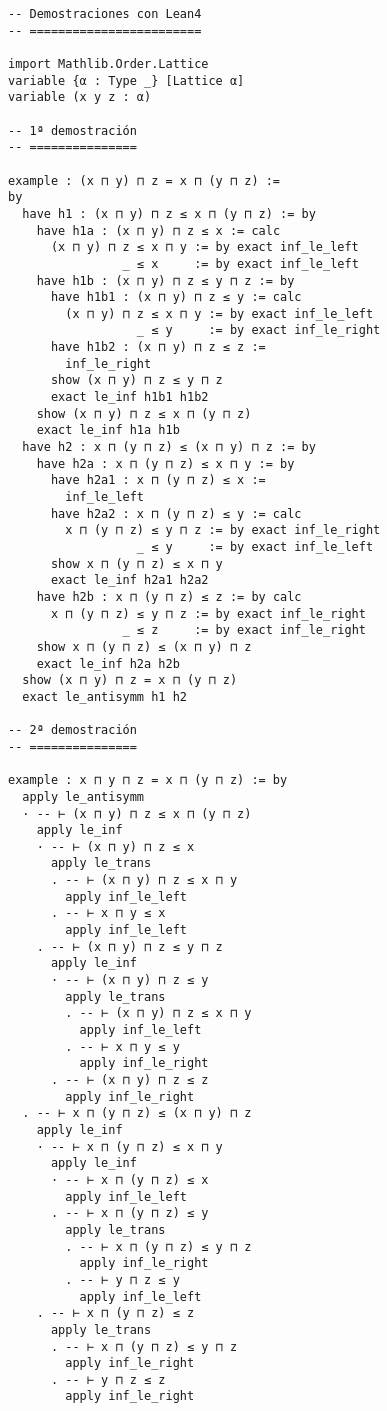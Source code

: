 \begin{verbatim}
-- Demostraciones con Lean4
-- ========================

import Mathlib.Order.Lattice
variable {α : Type _} [Lattice α]
variable (x y z : α)

-- 1ª demostración
-- ===============

example : (x ⊓ y) ⊓ z = x ⊓ (y ⊓ z) :=
by
  have h1 : (x ⊓ y) ⊓ z ≤ x ⊓ (y ⊓ z) := by
    have h1a : (x ⊓ y) ⊓ z ≤ x := calc
      (x ⊓ y) ⊓ z ≤ x ⊓ y := by exact inf_le_left
                _ ≤ x     := by exact inf_le_left
    have h1b : (x ⊓ y) ⊓ z ≤ y ⊓ z := by
      have h1b1 : (x ⊓ y) ⊓ z ≤ y := calc
        (x ⊓ y) ⊓ z ≤ x ⊓ y := by exact inf_le_left
                  _ ≤ y     := by exact inf_le_right
      have h1b2 : (x ⊓ y) ⊓ z ≤ z :=
        inf_le_right
      show (x ⊓ y) ⊓ z ≤ y ⊓ z
      exact le_inf h1b1 h1b2
    show (x ⊓ y) ⊓ z ≤ x ⊓ (y ⊓ z)
    exact le_inf h1a h1b
  have h2 : x ⊓ (y ⊓ z) ≤ (x ⊓ y) ⊓ z := by
    have h2a : x ⊓ (y ⊓ z) ≤ x ⊓ y := by
      have h2a1 : x ⊓ (y ⊓ z) ≤ x :=
        inf_le_left
      have h2a2 : x ⊓ (y ⊓ z) ≤ y := calc
        x ⊓ (y ⊓ z) ≤ y ⊓ z := by exact inf_le_right
                  _ ≤ y     := by exact inf_le_left
      show x ⊓ (y ⊓ z) ≤ x ⊓ y
      exact le_inf h2a1 h2a2
    have h2b : x ⊓ (y ⊓ z) ≤ z := by calc
      x ⊓ (y ⊓ z) ≤ y ⊓ z := by exact inf_le_right
                _ ≤ z     := by exact inf_le_right
    show x ⊓ (y ⊓ z) ≤ (x ⊓ y) ⊓ z
    exact le_inf h2a h2b
  show (x ⊓ y) ⊓ z = x ⊓ (y ⊓ z)
  exact le_antisymm h1 h2

-- 2ª demostración
-- ===============

example : x ⊓ y ⊓ z = x ⊓ (y ⊓ z) := by
  apply le_antisymm
  · -- ⊢ (x ⊓ y) ⊓ z ≤ x ⊓ (y ⊓ z)
    apply le_inf
    · -- ⊢ (x ⊓ y) ⊓ z ≤ x
      apply le_trans
      . -- ⊢ (x ⊓ y) ⊓ z ≤ x ⊓ y
        apply inf_le_left
      . -- ⊢ x ⊓ y ≤ x
        apply inf_le_left
    . -- ⊢ (x ⊓ y) ⊓ z ≤ y ⊓ z
      apply le_inf
      · -- ⊢ (x ⊓ y) ⊓ z ≤ y
        apply le_trans
        . -- ⊢ (x ⊓ y) ⊓ z ≤ x ⊓ y
          apply inf_le_left
        . -- ⊢ x ⊓ y ≤ y
          apply inf_le_right
      . -- ⊢ (x ⊓ y) ⊓ z ≤ z
        apply inf_le_right
  . -- ⊢ x ⊓ (y ⊓ z) ≤ (x ⊓ y) ⊓ z
    apply le_inf
    · -- ⊢ x ⊓ (y ⊓ z) ≤ x ⊓ y
      apply le_inf
      · -- ⊢ x ⊓ (y ⊓ z) ≤ x
        apply inf_le_left
      . -- ⊢ x ⊓ (y ⊓ z) ≤ y
        apply le_trans
        . -- ⊢ x ⊓ (y ⊓ z) ≤ y ⊓ z
          apply inf_le_right
        . -- ⊢ y ⊓ z ≤ y
          apply inf_le_left
    . -- ⊢ x ⊓ (y ⊓ z) ≤ z
      apply le_trans
      . -- ⊢ x ⊓ (y ⊓ z) ≤ y ⊓ z
        apply inf_le_right
      . -- ⊢ y ⊓ z ≤ z
        apply inf_le_right


\end{verbatim}
